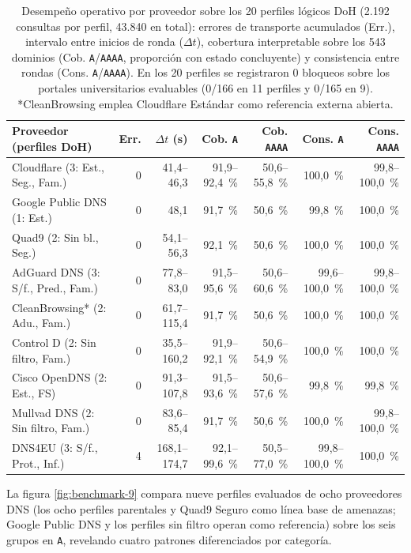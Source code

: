 \documentclass[10pt,a4paper]{article}
\begin{document}
\begin{table}[H]
\centering\scriptsize
\setlength{\tabcolsep}{3.5pt}
\caption{Desempeño operativo por proveedor sobre los 20 perfiles lógicos DoH (2.192 consultas por perfil, 43.840 en total): errores de transporte acumulados (Err.), intervalo entre inicios de ronda ($\Delta t$), cobertura interpretable sobre los 543 dominios (Cob. \texttt{A}/\texttt{AAAA}, proporción con estado concluyente) y consistencia entre rondas (Cons. \texttt{A}/\texttt{AAAA}). En los 20 perfiles se registraron 0 bloqueos sobre los portales universitarios evaluables (0/166 en 11 perfiles y 0/165 en 9). *CleanBrowsing emplea Cloudflare Estándar como referencia externa abierta.}
\label{tab:consistencia}
\begin{tabularx}{\textwidth}{Yrrrrrr}
\toprule
Proveedor (perfiles DoH) & Err. & $\Delta t$ (s) & Cob. \texttt{A} & Cob. \texttt{AAAA} & Cons. \texttt{A} & Cons. \texttt{AAAA}\\
\midrule
Cloudflare (3: Est., Seg., Fam.) & 0 & 41,4--46,3 & 91,9--92,4~\% & 50,6--55,8~\% & 100,0~\% & 99,8--100,0~\%\\
Google Public DNS (1: Est.) & 0 & 48,1 & 91,7~\% & 50,6~\% & 99,8~\% & 100,0~\%\\
Quad9 (2: Sin bl., Seg.) & 0 & 54,1--56,3 & 92,1~\% & 50,6~\% & 100,0~\% & 100,0~\%\\
AdGuard DNS (3: S/f., Pred., Fam.) & 0 & 77,8--83,0 & 91,5--95,6~\% & 50,6--60,6~\% & 99,6--100,0~\% & 99,8--100,0~\%\\
CleanBrowsing* (2: Adu., Fam.) & 0 & 61,7--115,4 & 91,7~\% & 50,6~\% & 100,0~\% & 100,0~\%\\
Control D (2: Sin filtro, Fam.) & 0 & 35,5--160,2 & 91,9--92,1~\% & 50,6--54,9~\% & 100,0~\% & 100,0~\%\\
Cisco OpenDNS (2: Est., FS) & 0 & 91,3--107,8 & 91,5--93,6~\% & 50,6--57,6~\% & 99,8~\% & 99,8~\%\\
Mullvad DNS (2: Sin filtro, Fam.) & 0 & 83,6--85,4 & 91,7~\% & 50,6~\% & 100,0~\% & 99,8--100,0~\%\\
DNS4EU (3: S/f., Prot., Inf.) & 4 & 168,1--174,7 & 92,1--99,6~\% & 50,5--77,0~\% & 99,8--100,0~\% & 100,0~\%\\
\bottomrule
\end{tabularx}
\end{table}

La figura \ref{fig:benchmark-9} compara nueve perfiles evaluados de ocho proveedores DNS (los ocho perfiles parentales y Quad9 Seguro como línea base de amenazas; Google Public DNS y los perfiles sin filtro operan como referencia) sobre los seis grupos en \texttt{A}, revelando cuatro patrones diferenciados por categoría.
\end{document}
